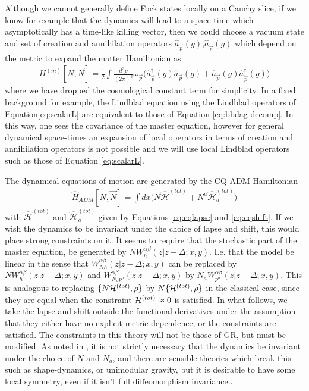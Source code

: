 \documentclass[aps,pra,showpacs,citeautoscript,amsmath,amssymb,floatfix,superscriptaddress,bbm, verbatim,amsfonts,changes,10pt,nofootinbib,longbibliography]{revtex4-1}
\def\z{{z}}
\def\Hq{\hat{H}}
\def\dist{{\Delta}}
\def\superhamtot{{\cal H}^{(tot)}}
\def\qsuperhamtot{\hat{\mathcal{H}}^{(tot)}}
\def\qsupermomtot{\qsuperhamtot}%
\def\matterham{H^{(m)}}
\def\lapsh{[N,\vec{N}]}
\newcommand{\ann}[1]{{\hat{a}}_{\vec{#1}}}
\newcommand{\adag}[1]{{\hat{a}}^\dagger_{\vec{#1}}}
\def\cqadm{{\Hq_{ADM}}}
\def\rate{{W}}
\def\ab{^{\alpha\beta}}
\begin{document}
Although we cannot generally define Fock states locally on a Cauchy slice, if we know for example that the dynamics will lead to a space-time which asymptotically has a time-like killing vector, then we could choose a vacuum state and
	\label{par:fock} 
set of creation and annihilation operators $\ann{p}(g)$,$\adag{p}(g)$ which depend on the metric to expand the matter Hamiltonian as
\begin{align}
\matterham\lapsh
= \frac{1}{2}\int \frac{d^3p}{(2\pi)^3}\omega_{\vec{p}}\Big( \adag{p}(g)\ann{p}(g)+\ann{p}(g)\adag{p}(g)\Big)
\label{eq:bbdag-decomp}
\end{align}
where %
we have dropped the 
cosmological constant term for simplicity. In a fixed background for example, the Lindblad equation using the Lindblad operators of Equation\eqref{eq:scalarL} are equivalent to those of Equation \eqref{eq:bbdag-decomp}. In this way, one sees the covariance of the master equation, however for general dynamical space-times an expansion of local operators in terms of creation and annihilation operators is not possible and we will use local Lindblad operators such as those
 of Equation \eqref{eq:scalarL}. %



The dynamical equations of motion are generated by the CQ-ADM Hamiltonian
\begin{align}
\cqadm[N,\vec{N}]=\int dx \big(N\qsuperhamtot+N^a\qsupermomtot_a\big)
\label{eq:CQADM}
\end{align}
with $\qsuperhamtot$ and $\qsupermomtot_a$ given by Equations \eqref{eq:cqlapse} and \eqref{eq:cqshift}. If we wish the dynamics to be invariant under the choice of lapse and shift, this would place strong constraints on it. 
It seems to
require that the stochastic part of the master equation, be generated by $N\rate_h\ab(\z|\z-\dist;x,y)$. I.e. that the model be linear in the sense that
$\rate\ab_{Nh}(\z|\z-\dist;x,y)$
can be replaced by
$N\rate\ab_{h}(\z|\z-\dist;x,y)$
and
$\rate\ab_{N_ap^a}(\z|\z-\dist;x,y)$
by $N_a\rate\ab_{p^a}(\z|\z-\dist;x,y)$. This is analogous to replacing $\{N\superhamtot,\rho\}$ by $N\{\superhamtot,\rho\}$ in the classical case, since they are equal when the constraint $\superhamtot\approx 0$ is satisfied.
	 In what follows, we take the lapse and shift outside the functional derivatives under the assumption that they
	either have no explicit metric dependence, or the constraints 
	are satisfied. The constraints in this theory will not be those of GR, but must be modified. As noted in \cite{UCL2022constraints}, it is not strictly necessary that the dynamics be invariant under the choice of $N$ and $N_a$, and there are sensible theories which break this such as shape-dynamics\cite{mercati2017shape, Anderson_2005, Gomes_2012}, or unimodular gravity\cite{einstein1952gravitational,van1982exchange,weinberg1989cosmological,unruh1989unimodular,alvarez2005can,smolin2009quantization, shaposhnikov2009scale}, but it is desirable to have some local symmetry, even if it isn't full diffeomorphism invariance.\label{ft:lapse_linear}.
	
\end{document}
